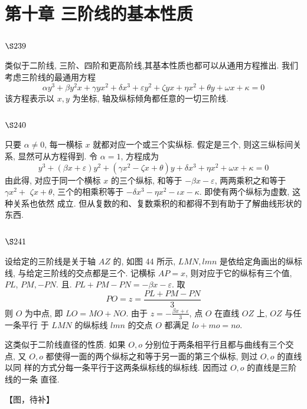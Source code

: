 \chapter{第十章 三阶线的基本性质}

\section{$\S 239$}

类似于二阶线, 三阶、四阶和更高阶线,其基本性质也都可以从通用方程推出. 我们 考虑三阶线的最通用方程
\[
\alpha y^{3}+\beta y^{2} x+\gamma y x^{2}+\delta x^{3}+\varepsilon y^{2}+\zeta y x+\eta x^{2}+\theta y+\omega x+\kappa=0
\]
该方程表示以 $x, y$ 为坐标, 轴及纵标倾角都任意的一切三阶线.

\section{$\S 240$}

只要 $\alpha \neq 0$, 每一横标 $x$ 就都对应一个或三个实纵标. 假定是三个, 则这三纵标间关 系, 显然可从方程得到. 令 $\alpha=1$, 方程成为
\[
y^{3}+(\beta x+\varepsilon) y^{2}+\left(\gamma x^{2}-\zeta x+\theta\right) y+\delta x^{3}+\eta x^{2}+\omega x+\kappa=0
\]
由此得, 对应于同一个横标 $x$ 的三个纵标, 和等于 $-\beta x-\varepsilon$, 两两乘积之和等于 $\gamma x^{2}+$ $\zeta x+\theta$, 三个的相乘积等于 $-\delta x^{3}-\eta x^{2}-\iota x-\kappa$. 即使有两个纵标为虚数, 这种关系也依然 成立. 但从复数的和、复数乘积的和都得不到有助于了解曲线形状的东西.

\section{$\S 241$}

设给定的三阶线是关于轴 $A Z$ 的, 如图 44 所示, $L M N, l m n$ 是依给定角画出的纵标 线, 与给定三阶线的交点都是三个. 记横标 $A P=x$, 则对应于它的纵标有三个值, $P L$, $P M,-P N$. 且. $P L+P M-P N=-\beta x-\varepsilon$. 取
\[
P O=z=\frac{P L+P M-P N}{3}
\]
则 $O$ 为中点, 即 $L O=M O+N O$. 由于 $z=-\frac{\beta x+\varepsilon}{3}$, 点 $O$ 在直线 $O Z$ 上, $O Z$ 与任一条平行 于 $L M N$ 的纵标线 $l m n$ 的交点 $O$ 都满足 $l o+m o=n o$.

这类似于二阶线直径的性质. 如果 $O, o$ 分别位于两条相平行且都与曲线有三个交 点, 又 $O, o$ 都使得一面的两个纵标之和等于另一面的第三个纵标, 则过 $O, o$ 的直线以同 样的方式分每一条平行于这两条纵标线的纵标线. 因而过 $O, o$ 的直线是三阶线的一条 直径. 


【图，待补】

